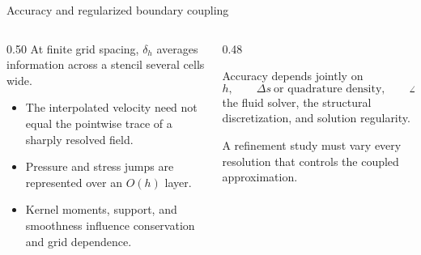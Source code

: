 \documentclass[aspectratio=169,11pt]{beamer}
\begin{document}
\begin{frame}{Accuracy and regularized boundary coupling}
\begin{columns}[T,onlytextwidth]
\begin{column}{0.50\textwidth}
At finite grid spacing, \(\delta_h\) averages information across a stencil several cells wide.
\begin{itemize}\itemsep5pt
  \item The interpolated velocity need not equal the pointwise trace of a sharply resolved field.
  \item Pressure and stress jumps are represented over an \(O(h)\) layer.
  \item Kernel moments, support, and smoothness influence conservation and grid dependence.
\end{itemize}
\end{column}
\begin{column}{0.48\textwidth}
\begin{punchbox}
\small Accuracy depends jointly on
\[
h,\qquad \Delta s\ \text{or quadrature density},\qquad \Delta t,
\]
the fluid solver, the structural discretization, and solution regularity.
\end{punchbox}
\medskip
\small A refinement study must vary every resolution that controls the coupled approximation.
\end{column}
\end{columns}
\end{frame}
\end{document}
